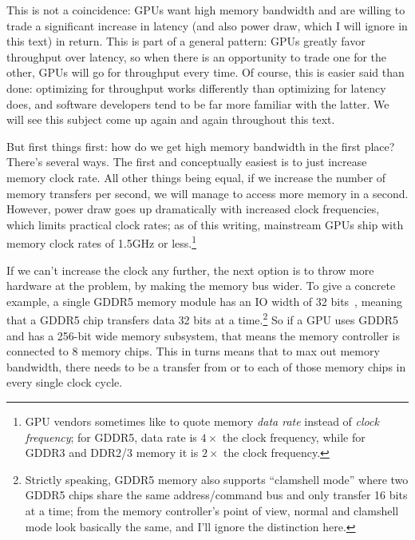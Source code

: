 This is not a coincidence: GPUs want high memory bandwidth and are willing to trade a significant
increase in latency (and also power draw, which I will ignore in this text) in return. This is part
of a general pattern: GPUs greatly favor throughput over latency, so when there is an opportunity to
trade one for the other, GPUs will go for throughput every time. Of course, this is easier said than
done: optimizing for throughput works differently than optimizing for latency does, and software
developers tend to be far more familiar with the latter. We will see this subject come up again and again
throughout this text.

But first things first: how do we get high memory bandwidth in the first place? There's several ways.
The first and conceptually easiest is to just increase memory clock rate. All other things being equal,
if we increase the number of memory transfers per second, we will manage to access more memory in a second.
However, power draw goes up dramatically with increased clock frequencies, which limits practical clock rates;
as of this writing, mainstream GPUs ship with memory clock rates of 1.5GHz or less.\footnote{GPU vendors
sometimes like to quote memory \emph{data rate} instead of \emph{clock frequency}; for GDDR5, data rate is $4 \times$
the clock frequency, while for GDDR3 and DDR2/3 memory it is $2 \times$ the clock frequency.}

If we can't increase the clock any further, the next option is to throw more hardware at the problem, by
making the memory bus wider. To give a concrete example, a single GDDR5 memory module has an
IO width of 32 bits~\citep{elpida-gddr5}, meaning that a GDDR5 chip transfers data 32 bits at a time.\footnote{Strictly
speaking, GDDR5 memory also supports ``clamshell mode'' where two GDDR5 chips share the same address/command bus
and only transfer 16 bits at a time; from the memory controller's point of view, normal and clamshell mode
look basically the same, and I'll ignore the distinction here.} So if a GPU uses GDDR5 and has a 256-bit
wide memory subsystem, that means the memory controller is connected to 8 memory chips. This in turns means that
to max out memory bandwidth, there needs to be a transfer from or to each of those memory chips in every single clock
cycle.

